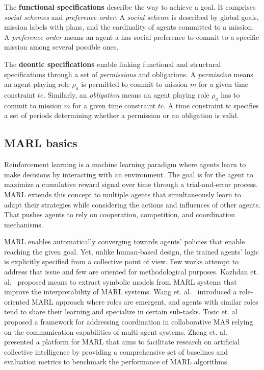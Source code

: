 \documentclass[runningheads]{llncs}
\begin{document}
The \textbf{functional specifications} describe the way to achieve a goal. It comprises \emph{social schemes} and \emph{preference order}. A \emph{social scheme} is described by global goals, mission labels with plans, and the cardinality of agents committed to a mission. A \emph{preference order} means an agent a has social preference to commit to a specific mission among several possible ones.

The \textbf{deontic specifications} enable linking functional and structural specifications through a set of \emph{permissions} and obligations. A \emph{permission} means an agent playing role $\rho_a$ is permitted to commit to mission $m$ for a given time constraint $tc$. Similarly, an \emph{obligation} means an agent playing role $\rho_a$ has to commit to mission $m$ for a given time constraint $tc$. A time constraint $tc $ specifies a set of periods determining whether a permission or an obligation is valid.


\subsection{MARL basics}

Reinforcement learning is a machine learning paradigm where agents learn to make decisions by interacting with an environment. The goal is for the agent to maximize a cumulative reward signal over time through a trial-and-error process.
MARL extends this concept to multiple agents that simultaneously learn to adapt their strategies while considering the actions and influences of other agents. That pushes agents to rely on cooperation, competition, and coordination mechanisms.

MARL enables automatically converging towards agents’ policies that enable reaching the given goal. Yet, unlike human-based design, the trained agents' logic is explicitly specified from a collective point of view. Few works attempt to address that issue and few are oriented for methodological purposes.
Kazhdan et. al.~\cite{Kazhdan2020} proposed means to extract symbolic models from MARL systems that improve the interpretability of MARL systems.
Wang et. al.~\cite{Wang2020} introduced a role-oriented MARL approach where roles are emergent, and agents with similar roles tend to share their learning and specialize in certain sub-tasks.
Tosic et. al~\cite{Tosic2010} proposed a framework for addressing coordination in collaborative MAS relying on the communication capabilities of multi-agent systems.
Zheng et. al.~\cite{Zheng2018} presented a platform for MARL that aims to facilitate research on artificial collective intelligence by providing a comprehensive set of baselines and evaluation metrics to benchmark the performance of MARL algorithms.
\end{document}
